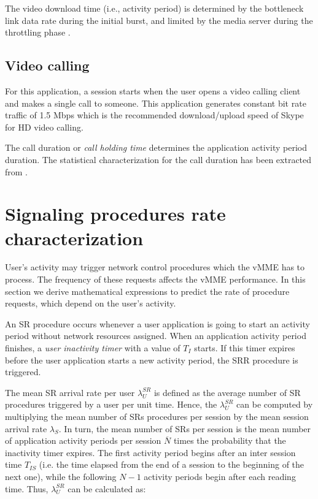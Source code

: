 \documentclass[conference]{IEEEtran}
\begin{document}
 The video download time (i.e., activity period) is determined by the bottleneck link data rate during the initial burst, and limited by the media server during the throttling phase \cite{Ameigeiras12}.
 


\subsection{Video calling}
For this application, a session starts when the user opens a video calling client and makes a single call to someone. This application generates constant bit rate traffic of 1.5 Mbps which is the recommended download/upload speed of Skype for HD video calling.
 
 The call duration or \emph{call holding time} determines the application activity period duration. The statistical characterization for the call duration has been extracted from \cite{Trang04}.




\section{Signaling procedures rate characterization}
\label{sec:arrival-rate}


 User's activity may trigger network control procedures which the vMME has to process. The frequency of these requests affects the vMME performance. In this section we derive mathematical expressions to predict the rate of procedure requests, which depend on the user's activity. 


An SR procedure occurs whenever a user application is going to start an activity period without network resources assigned. When an application activity period finishes, a \emph{user inactivity timer} with a value of $T_{I}$ starts. If this timer expires before the user application starts a new activity period, the SRR procedure is triggered. 

The mean SR arrival rate per user $\lambda_{U}^{SR}$ is defined as the average number of SR procedures triggered by a user per unit time. Hence, the $\lambda_{U}^{SR}$ can be computed by multiplying the mean number of SRs procedures per session by the mean session arrival rate $\lambda_{S}$. In turn, the mean number of SRs per session is the mean number of application activity periods per session $\overline{N}$ times the probability that the inactivity timer expires. The first activity period begins after an inter session time $T_{IS}$ (i.e. the time elapsed from the end of a session to the beginning of the next one), while the following $N-1$ activity periods begin after each reading time. Thus, $\lambda_{U}^{SR}$ can be calculated as: 
\end{document}
